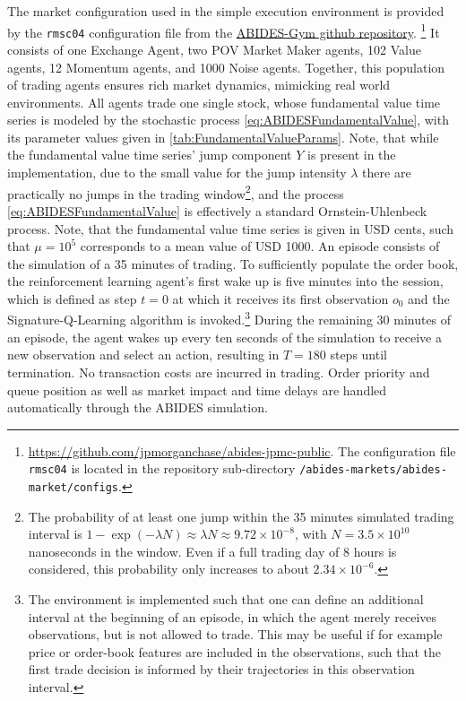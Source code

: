 \documentclass[
    a4paper,
    11pt,
    bibliography=totoc,
    listof=totoc,      
    headinclude=true,
    cleardoublepage=empty,
]{scrbook}
\theoremstyle{plain}
\theoremstyle{definition}
\theoremstyle{remark}
\begin{document}
The market configuration used in the simple execution environment is provided 
by the \texttt{rmsc04} configuration file from the
\href{https://github.com/jpmorganchase/abides-jpmc-public}
{ABIDES-Gym github repository}.%
\footnote{
    \url{https://github.com/jpmorganchase/abides-jpmc-public}. The
    configuration file \texttt{rmsc04} is located in the repository 
    sub-directory \texttt{/abides-markets/abides-market/configs}.
}
It consists of one Exchange Agent, two POV Market Maker agents, 102 Value
agents, 12 Momentum agents, and 1000 Noise agents. Together, this population of
trading agents ensures rich market dynamics, mimicking real world
environments. All agents trade one single stock, whose fundamental value time
series is modeled by the stochastic process \eqref{eq:ABIDESFundamentalValue},
with its parameter values given in \cref{tab:FundamentalValueParams}. Note, 
that while the fundamental value time series' jump component $Y$ is present in 
the implementation, due to the small value for the jump intensity $\lambda$ 
there are practically no jumps in the trading window\footnote{
    The probability of at least one jump within the 35 minutes simulated 
    trading interval is $1-\exp(-\lambda N)\approx \lambda N 
    \approx 9.72\times 10^{-8}$, with $N=3.5\times 10^{10}$ nanoseconds in the 
    window. Even if a full trading day of 8 hours is considered, this 
    probability only increases to about $2.34\times10^{-6}$.
}, and the process \eqref{eq:ABIDESFundamentalValue} is effectively a standard 
Ornstein-Uhlenbeck process.
Note,
that the fundamental value time series is given in USD cents, such that 
$\mu=10^5$ corresponds to a mean value of USD 1000. An episode consists of
the simulation of a 35 minutes of trading. To sufficiently populate the order 
book, the reinforcement learning agent's first wake up is five minutes into 
the session, which is defined as step $t=0$ at which it receives its first 
observation $o_0$ and the Signature-Q-Learning algorithm is invoked.\footnote{
    The environment is implemented such that one can define an additional 
    interval at the beginning of an episode, in which the agent merely 
    receives observations, but is not allowed to trade. This may be useful if 
    for example price or order-book features are included in the observations, 
    such that the first trade decision is informed by their trajectories in 
    this observation interval.
}
During the remaining 30 minutes of an episode, the agent wakes up every ten 
seconds of the simulation to receive a new observation and select an action, 
resulting in $T=180$ steps until termination. No transaction costs are 
incurred in trading. Order priority and queue position as well as market 
impact and time delays are handled automatically through the ABIDES simulation.
\end{document}
